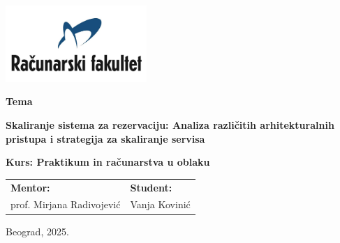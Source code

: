 \documentclass[12pt]{article}
\begin{document}

\begin{titlepage}
    \begin{center}
        
        \vspace*{-1in}
        \includegraphics[width=0.4\textwidth]{raf_logo.png}

        \vspace{1in}
        \Large
        \textbf{Tema}
        
        \vspace{1in}
        \Huge
        \textbf{Skaliranje sistema za rezervaciju: Analiza različitih arhitekturalnih pristupa i strategija za skaliranje servisa}
        
        \vspace{1in}


            \fontsize{17pt}{17pt}\selectfont
            \textbf{Kurs: Praktikum in računarstva u oblaku} \\
            \vspace*{1.5in}
            
            \begin{center}
            \normalsize
            \begin{tabular}{p{} p{}}
                \fontsize{14pt}{18pt}\selectfont   
                \textbf{Mentor:} & 
            
                \fontsize{14pt}{18pt}\selectfont
                \textbf{Student:} \\
                prof. Mirjana Radivojević & Vanja Kovinić \\
            \end{tabular}
            \end{center}

            \vspace*{\fill}

            \normalsize
            Beograd, 2025.


            
        \end{center}
    \end{titlepage}
    \restoregeometry %
\end{document}
